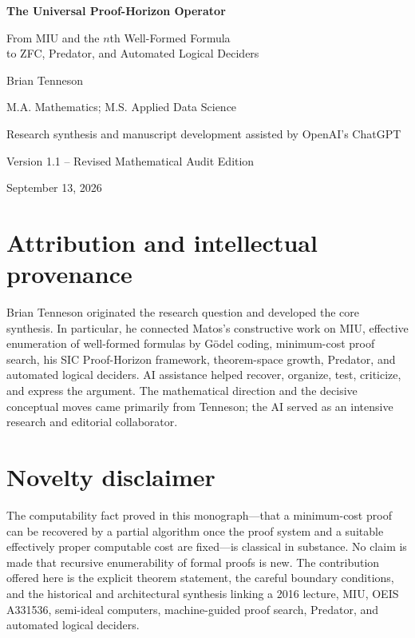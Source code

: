 \documentclass[11pt,oneside]{book}
\theoremstyle{definition}
\theoremstyle{remark}
\begin{document}
\hypersetup{pageanchor=false}
\begin{titlepage}
\centering
\vspace*{1.0in}
{\Huge\bfseries The Universal Proof-Horizon Operator\par}
\vspace{0.35in}
{\Large From MIU and the $n$th Well-Formed Formula\\
to ZFC, Predator, and Automated Logical Deciders\par}
\vspace{0.8in}
{\Large Brian Tenneson\par}
\vspace{0.15in}
{\large M.A. Mathematics; M.S. Applied Data Science\par}
\vfill
{\large Research synthesis and manuscript development assisted by OpenAI's ChatGPT\par}
\vspace{0.25in}
{\large Version 1.1 -- Revised Mathematical Audit Edition\par}
{\large September 13, 2026\par}
\end{titlepage}
\clearpage
\hypersetup{pageanchor=true}
\frontmatter

\chapter*{Attribution and intellectual provenance}
Brian Tenneson originated the research question and developed the core synthesis. In particular, he connected Matos's constructive work on MIU, effective enumeration of well-formed formulas by G\"odel coding, minimum-cost proof search, his SIC Proof-Horizon framework, theorem-space growth, Predator, and automated logical deciders. AI assistance helped recover, organize, test, criticize, and express the argument. The mathematical direction and the decisive conceptual moves came primarily from Tenneson; the AI served as an intensive research and editorial collaborator.

\chapter*{Novelty disclaimer}
The computability fact proved in this monograph---that a minimum-cost proof can be recovered by a partial algorithm once the proof system and a suitable effectively proper computable cost are fixed---is classical in substance. No claim is made that recursive enumerability of formal proofs is new. The contribution offered here is the explicit theorem statement, the careful boundary conditions, and the historical and architectural synthesis linking a 2016 lecture, MIU, OEIS A331536, semi-ideal computers, machine-guided proof search, Predator, and automated logical deciders.
\end{document}
